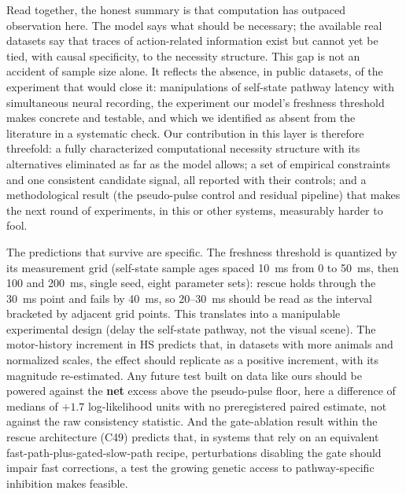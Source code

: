 \documentclass[pdflatex,sn-nature]{sn-jnl}
\begin{document}
Read together, the honest summary is that computation has outpaced observation here. The model says what should be necessary; the available real datasets say that traces of action-related information exist but cannot yet be tied, with causal specificity, to the necessity structure. This gap is not an accident of sample size alone. It reflects the absence, in public datasets, of the experiment that would close it: manipulations of self-state pathway latency with simultaneous neural recording, the experiment our model's freshness threshold makes concrete and testable, and which we identified as absent from the literature in a systematic check. Our contribution in this layer is therefore threefold: a fully characterized computational necessity structure with its alternatives eliminated as far as the model allows; a set of empirical constraints and one consistent candidate signal, all reported with their controls; and a methodological result (the pseudo-pulse control and residual pipeline) that makes the next round of experiments, in this or other systems, measurably harder to fool.

The predictions that survive are specific. The freshness threshold is quantized by its measurement grid (self-state sample ages spaced 10~ms from 0 to 50~ms, then 100 and 200~ms, single seed, eight parameter sets): rescue holds through the 30~ms point and fails by 40~ms, so 20--30~ms should be read as the interval bracketed by adjacent grid points. This translates into a manipulable experimental design (delay the self-state pathway, not the visual scene). The motor-history increment in HS predicts that, in datasets with more animals and normalized scales, the effect should replicate as a positive increment, with its magnitude re-estimated. Any future test built on data like ours should be powered against the \textbf{net} excess above the pseudo-pulse floor, here a difference of medians of $+1.7$ log-likelihood units with no preregistered paired estimate, not against the raw consistency statistic. And the gate-ablation result within the rescue architecture (C49) predicts that, in systems that rely on an equivalent fast-path-plus-gated-slow-path recipe, perturbations disabling the gate should impair fast corrections, a test the growing genetic access to pathway-specific inhibition makes feasible.
\end{document}
